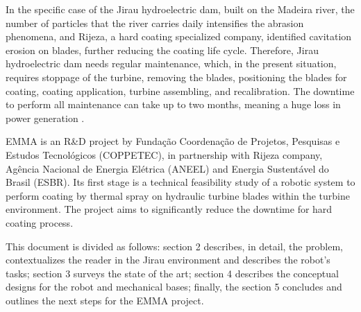In the specific case of the Jirau hydroelectric dam, built on the Madeira
river, the number of particles that the river carries daily intensifies the
abrasion phenomena, and Rijeza, a hard coating specialized company, identified
cavitation erosion on blades, further reducing the coating life cycle.
Therefore, Jirau hydroelectric dam needs regular maintenance, which,
in the present situation, requires stoppage of the turbine, removing the blades,
positioning the blades for coating, coating application, turbine assembling, and recalibration. The downtime to perform all
maintenance can take up to two months, meaning a huge loss in power generation .

EMMA is an R\&D project by Fundação Coordenação de Projetos, Pesquisas e Estudos
Tecnológicos (COPPETEC), in partnership with Rijeza company, Agência Nacional de
Energia Elétrica (ANEEL) and Energia Sustentável do Brasil (ESBR). Its first
stage is a technical feasibility study of a robotic system to perform
coating by thermal spray on hydraulic turbine blades within the turbine
environment. The project aims to significantly reduce the downtime for hard
coating process.

This document is divided as follows: section 2 describes, in detail, the
problem, contextualizes the reader in the Jirau environment and
describes the robot's tasks; section 3 surveys the state of the
art; section 4 describes the conceptual designs for the robot and mechanical
bases; finally, the section 5 concludes and outlines the next steps for the
EMMA project.
